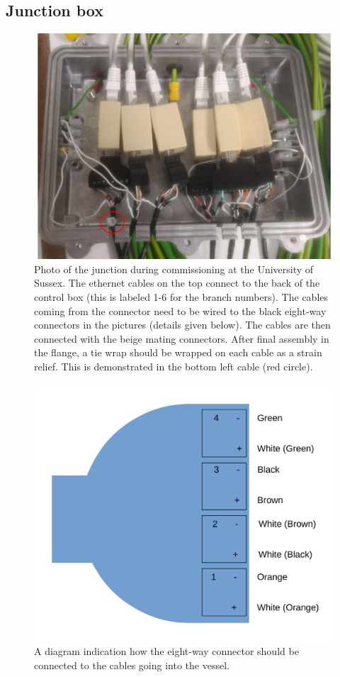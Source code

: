 \subsection*{Junction box}

\begin{figure}
\begin{center}	
  \includegraphics[width=0.75\linewidth]{figures/junction_box.jpg}
  \caption{Photo of the junction during commissioning at the University of Sussex. The ethernet cables on the top connect to the back of the control box (this is labeled 1-6 for the branch numbers). The cables coming from the connector need to be wired to the black eight-way connectors in the pictures (details given below). The cables are then connected with the beige mating connectors. After final assembly in the flange, a tie wrap should be wrapped on each cable as a strain relief. This is demonstrated in the bottom left cable (red circle). }
  \label{figure:junction_box}
\end{center}
\end{figure}

\begin{figure}
\begin{center}	
  \includegraphics[width=0.5\linewidth]{figures/connector.pdf}
  \caption{A diagram indication how the eight-way connector should be connected to the cables going into the vessel.}
  \label{figure:connector}
\end{center}
\end{figure}


